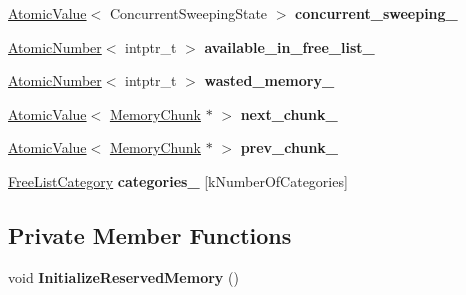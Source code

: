\begin{DoxyCompactItemize}
\item 
\hyperlink{classv8_1_1internal_1_1_atomic_value}{Atomic\+Value}$<$ Concurrent\+Sweeping\+State $>$ {\bfseries concurrent\+\_\+sweeping\+\_\+}\hypertarget{classv8_1_1internal_1_1_memory_chunk_a270c76fc3b182e662a375a80916a24cf}{}\label{classv8_1_1internal_1_1_memory_chunk_a270c76fc3b182e662a375a80916a24cf}

\item 
\hyperlink{classv8_1_1internal_1_1_atomic_number}{Atomic\+Number}$<$ intptr\+\_\+t $>$ {\bfseries available\+\_\+in\+\_\+free\+\_\+list\+\_\+}\hypertarget{classv8_1_1internal_1_1_memory_chunk_a03b2c99cba48f3eade4384957c19e607}{}\label{classv8_1_1internal_1_1_memory_chunk_a03b2c99cba48f3eade4384957c19e607}

\item 
\hyperlink{classv8_1_1internal_1_1_atomic_number}{Atomic\+Number}$<$ intptr\+\_\+t $>$ {\bfseries wasted\+\_\+memory\+\_\+}\hypertarget{classv8_1_1internal_1_1_memory_chunk_ad79f007b19057d01f1719836d24f5f33}{}\label{classv8_1_1internal_1_1_memory_chunk_ad79f007b19057d01f1719836d24f5f33}

\item 
\hyperlink{classv8_1_1internal_1_1_atomic_value}{Atomic\+Value}$<$ \hyperlink{classv8_1_1internal_1_1_memory_chunk}{Memory\+Chunk} $\ast$ $>$ {\bfseries next\+\_\+chunk\+\_\+}\hypertarget{classv8_1_1internal_1_1_memory_chunk_a0a4c0a4b0714380eaf43c3746080a1e0}{}\label{classv8_1_1internal_1_1_memory_chunk_a0a4c0a4b0714380eaf43c3746080a1e0}

\item 
\hyperlink{classv8_1_1internal_1_1_atomic_value}{Atomic\+Value}$<$ \hyperlink{classv8_1_1internal_1_1_memory_chunk}{Memory\+Chunk} $\ast$ $>$ {\bfseries prev\+\_\+chunk\+\_\+}\hypertarget{classv8_1_1internal_1_1_memory_chunk_ab3429c0a9524b95eed1c35d33d297ea3}{}\label{classv8_1_1internal_1_1_memory_chunk_ab3429c0a9524b95eed1c35d33d297ea3}

\item 
\hyperlink{classv8_1_1internal_1_1_free_list_category}{Free\+List\+Category} {\bfseries categories\+\_\+} \mbox{[}k\+Number\+Of\+Categories\mbox{]}\hypertarget{classv8_1_1internal_1_1_memory_chunk_a5b1e8024498f00883a8b4dd6445e78ce}{}\label{classv8_1_1internal_1_1_memory_chunk_a5b1e8024498f00883a8b4dd6445e78ce}

\end{DoxyCompactItemize}
\subsection*{Private Member Functions}
\begin{DoxyCompactItemize}
\item 
void {\bfseries Initialize\+Reserved\+Memory} ()\hypertarget{classv8_1_1internal_1_1_memory_chunk_a67d9059f8db73364276d6ab010470ba6}{}\label{classv8_1_1internal_1_1_memory_chunk_a67d9059f8db73364276d6ab010470ba6}

\end{DoxyCompactItemize}

